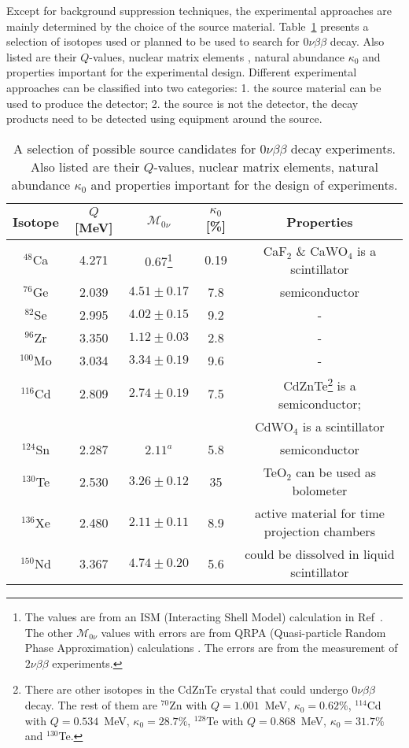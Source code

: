Except for background suppression techniques, the experimental
approaches are mainly determined by the choice of the source
material. Table~\ref{tab:gerda:iso} presents a selection of isotopes
used or planned to be used to search for $0\nu\beta\beta$ decay. Also
listed are their $Q$-values, nuclear matrix elements \cite{Mut90,
Rod07, Sim08, Cau08}, natural abundance $\kappa_{0}$ and properties
important for the experimental design. Different experimental
approaches can be classified into two categories: 1. the source
material can be used to produce the detector; 2. the source is not the
detector, the decay products need to be detected using equipment
around the source.
\begin{table}[htbp]
\centering
\caption{A selection of possible source candidates for
$0\nu\beta\beta$ decay experiments. Also listed are their $Q$-values,
nuclear matrix elements, natural abundance $\kappa_{0}$ and properties
important for the design of experiments.}
\label{tab:gerda:iso}
\begin{minipage}{\linewidth}
\begin{tabular}{ccccc} \hline Isotope & $Q$ [MeV] &
$\mathcal{M}_{0\nu}$ & $\kappa_{0}$ [\%] & Properties \\\hline
$^{48}$Ca & 4.271 & 0.67\footnote{The values are from an ISM 
(Interacting Shell Model) calculation in Ref~\cite{Cau08}. 
The other $\mathcal{M}_{0\nu}$ values with errors are from QRPA 
(Quasi-particle Random Phase Approximation) calculations 
\cite{Rod07}. The errors are from the measurement of 
$2\nu\beta\beta$ experiments.} & 0.19 & CaF$_{2}$ \& 
CaWO$_{4}$ is a scintillator \\
$^{76}$Ge & 2.039 & $4.51 \pm 0.17$ & 7.8 & semiconductor \\
$^{82}$Se & 2.995 & $4.02 \pm 0.15$ & 9.2 & - \\
$^{96}$Zr & 3.350 & $1.12 \pm 0.03$ & 2.8 & - \\
$^{100}$Mo & 3.034 & $3.34 \pm 0.19$ & 9.6 & - \\
$^{116}$Cd & 2.809 & $2.74 \pm 0.19$ & 7.5 & 
CdZnTe\footnote{There are other isotopes in the CdZnTe crystal
that could undergo $0\nu\beta\beta$ decay. The rest of them 
are $^{70}$Zn with $Q = 1.001$~MeV, $\kappa_{0} = 0.62\%$,
$^{114}$Cd with $Q = 0.534$~MeV, $\kappa_{0} = 28.7\%$, $^{128}$Te
with $Q = 0.868$~MeV, $\kappa_{0} = 31.7\%$ and $^{130}$Te.} is a 
semiconductor;\\
& & & & CdWO$_{4}$ is a scintillator\\
$^{124}$Sn & 2.287 & $2.11^{a}$ & 5.8 & semiconductor \\
$^{130}$Te & 2.530 & $3.26 \pm 0.12$ & 35 & TeO$_{2}$ can be 
used as bolometer\\
$^{136}$Xe & 2.480 & $2.11 \pm 0.11$ & 8.9 & active material for 
time projection chambers\\
$^{150}$Nd & 3.367 & $4.74 \pm 0.20$ & 5.6 & could be dissolved 
in liquid scintillator\\
\end{tabular}
\end{minipage}
\end{table}

